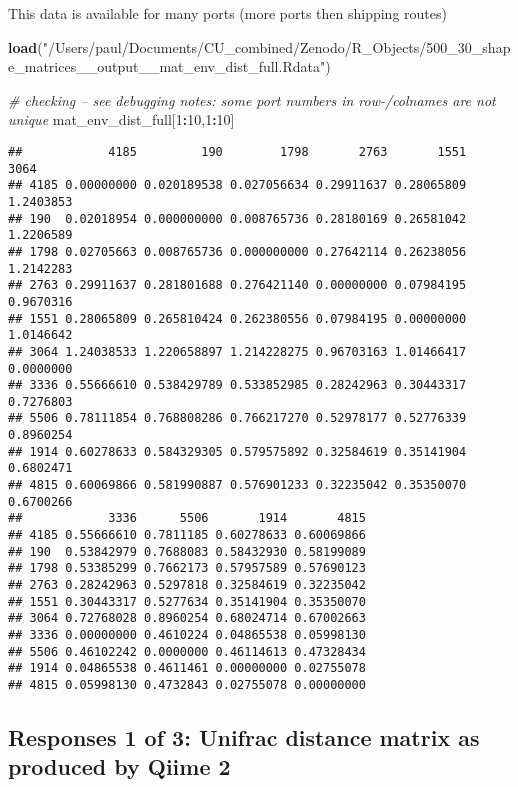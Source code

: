 \documentclass[]{article}
\newenvironment{Shaded}{\begin{snugshade}}{\end{snugshade}}
\newcommand{\KeywordTok}[1]{\textcolor[rgb]{0.13,0.29,0.53}{\textbf{#1}}}
\newcommand{\DecValTok}[1]{\textcolor[rgb]{0.00,0.00,0.81}{#1}}
\newcommand{\StringTok}[1]{\textcolor[rgb]{0.31,0.60,0.02}{#1}}
\newcommand{\CommentTok}[1]{\textcolor[rgb]{0.56,0.35,0.01}{\textit{#1}}}
\newcommand{\OperatorTok}[1]{\textcolor[rgb]{0.81,0.36,0.00}{\textbf{#1}}}
\newcommand{\NormalTok}[1]{#1}
\begin{document}
This data is available for many ports (more ports then shipping routes)

\begin{Shaded}
\begin{Highlighting}[]
\KeywordTok{load}\NormalTok{(}\StringTok{"/Users/paul/Documents/CU_combined/Zenodo/R_Objects/500_30_shape_matrices__output__mat_env_dist_full.Rdata"}\NormalTok{)}

\CommentTok{# checking -- see debugging notes: some port numbers in row-/colnames are not unique}
\NormalTok{mat_env_dist_full[}\DecValTok{1}\OperatorTok{:}\DecValTok{10}\NormalTok{,}\DecValTok{1}\OperatorTok{:}\DecValTok{10}\NormalTok{]}
\end{Highlighting}
\end{Shaded}

\begin{verbatim}
##            4185         190        1798       2763       1551      3064
## 4185 0.00000000 0.020189538 0.027056634 0.29911637 0.28065809 1.2403853
## 190  0.02018954 0.000000000 0.008765736 0.28180169 0.26581042 1.2206589
## 1798 0.02705663 0.008765736 0.000000000 0.27642114 0.26238056 1.2142283
## 2763 0.29911637 0.281801688 0.276421140 0.00000000 0.07984195 0.9670316
## 1551 0.28065809 0.265810424 0.262380556 0.07984195 0.00000000 1.0146642
## 3064 1.24038533 1.220658897 1.214228275 0.96703163 1.01466417 0.0000000
## 3336 0.55666610 0.538429789 0.533852985 0.28242963 0.30443317 0.7276803
## 5506 0.78111854 0.768808286 0.766217270 0.52978177 0.52776339 0.8960254
## 1914 0.60278633 0.584329305 0.579575892 0.32584619 0.35141904 0.6802471
## 4815 0.60069866 0.581990887 0.576901233 0.32235042 0.35350070 0.6700266
##            3336      5506       1914       4815
## 4185 0.55666610 0.7811185 0.60278633 0.60069866
## 190  0.53842979 0.7688083 0.58432930 0.58199089
## 1798 0.53385299 0.7662173 0.57957589 0.57690123
## 2763 0.28242963 0.5297818 0.32584619 0.32235042
## 1551 0.30443317 0.5277634 0.35141904 0.35350070
## 3064 0.72768028 0.8960254 0.68024714 0.67002663
## 3336 0.00000000 0.4610224 0.04865538 0.05998130
## 5506 0.46102242 0.0000000 0.46114613 0.47328434
## 1914 0.04865538 0.4611461 0.00000000 0.02755078
## 4815 0.05998130 0.4732843 0.02755078 0.00000000
\end{verbatim}

\subsection{Responses 1 of 3: Unifrac distance matrix as produced by
Qiime
2}\label{responses-1-of-3-unifrac-distance-matrix-as-produced-by-qiime-2}
\end{document}
